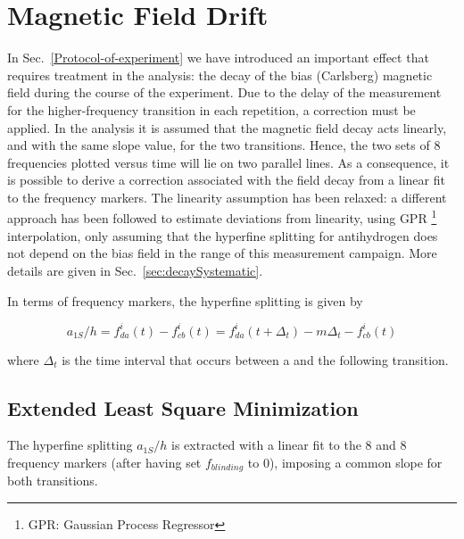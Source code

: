 \section{Magnetic Field Drift}

In Sec.~\ref{Protocol-of-experiment} we have introduced an important effect that requires treatment in the analysis: the decay of the bias (Carlsberg) magnetic field during the course of the experiment. Due to the delay of the measurement for the higher-frequency transition in each repetition, a correction must be applied. In the analysis it is assumed that the magnetic field decay acts linearly, and with the same slope value, for the two transitions. Hence, the two sets of 8 frequencies plotted versus time will lie on two parallel lines. As a consequence, it is possible to derive a correction associated with the field decay from a linear fit to the frequency markers. The linearity assumption has been relaxed: a different approach has been followed to estimate deviations from linearity, using GPR \footnote{GPR: Gaussian Process Regressor} interpolation, only assuming that the hyperfine splitting for antihydrogen does not depend on the bias field in the range of this measurement campaign. More details are given in Sec.~\ref{sec:decaySystematic}.

In terms of frequency markers, the hyperfine splitting is given by

\begin{equation}
a_{1S}/h = f_{da}^{i}(t) - f_{cb}^{i}(t) =  f_{da}^{i}(t + \Delta_t) - m \Delta_t - f_{cb}^{i}(t)
\end{equation}

where $\Delta_t$ is the time interval that occurs between a \cb and the following \da transition.


\subsection{Extended Least Square Minimization} \label{sec:CommonFitExtraction}

The hyperfine splitting $a_{1S}/h$ is extracted with a linear fit to the 8 \cb and 8 \da frequency markers (after having set $f_{blinding}$ to 0), imposing a common slope for both transitions.

